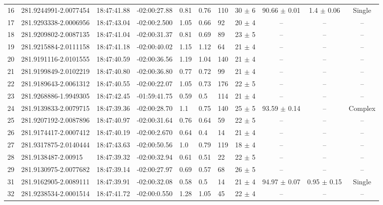 \documentclass[longauth]{aa} %
\begin{document}
\begin{appendix}
\begin{table}[htbp!]
\begin{tabular}{llllllllccc}
16  &  281.9244991-2.0077454  &  18:47:41.88  &  -02:00:27.88  &  0.81  &  0.76  &  110  &  30 $\pm$ 6  &  90.66 $\pm$ 0.01  &  1.4 $\pm$ 0.06  &  Single \\
17  &  281.9293338-2.0006956  &  18:47:43.04  &  -02:00:2.500  &  1.05  &  0.66  &  92  &  20 $\pm$ 4  &  --  &  --  &  -- \\
18  &  281.9209802-2.0087135  &  18:47:41.04  &  -02:00:31.37  &  0.81  &  0.69  &  89  &  23 $\pm$ 5  &  --  &  --  &  -- \\
19  &  281.9215884-2.0111158  &  18:47:41.18  &  -02:00:40.02  &  1.15  &  1.12  &  64  &  21 $\pm$ 4  &  --  &  --  &  -- \\
20  &  281.9191116-2.0101555  &  18:47:40.59  &  -02:00:36.56  &  1.19  &  1.04  &  140  &  21 $\pm$ 4  &  --  &  --  &  -- \\
21  &  281.9199849-2.0102219  &  18:47:40.80  &  -02:00:36.80  &  0.77  &  0.72  &  99  &  21 $\pm$ 4  &  --  &  --  &  -- \\
22  &  281.9189643-2.0061312  &  18:47:40.55  &  -02:00:22.07  &  1.05  &  0.73  &  176  &  22 $\pm$ 5  &  --  &  --  &  -- \\
23  &  281.9268886-1.9949305  &  18:47:42.45  &  -01:59:41.75  &  0.59  &  0.5  &  114  &  21 $\pm$ 4  &  --  &  --  &  -- \\
24  &  281.9139833-2.0079715  &  18:47:39.36  &  -02:00:28.70  &  1.1  &  0.75  &  140  &  25 $\pm$ 5  &  93.59 $\pm$ 0.14  &  --  &  Complex \\
25  &  281.9207192-2.0087896  &  18:47:40.97  &  -02:00:31.64  &  0.76  &  0.64  &  59  &  22 $\pm$ 5  &  --  &  --  &  -- \\
26  &  281.9174417-2.0007412  &  18:47:40.19  &  -02:00:2.670  &  0.64  &  0.4  &  14  &  21 $\pm$ 4  &  --  &  --  &  -- \\
27  &  281.9317875-2.0140444  &  18:47:43.63  &  -02:00:50.56  &  1.0  &  0.79  &  119  &  18 $\pm$ 4  &  --  &  --  &  -- \\
28  &  281.9138487-2.00915  &  18:47:39.32  &  -02:00:32.94  &  0.61  &  0.51  &  22  &  22 $\pm$ 5  &  --  &  --  &  -- \\
29  &  281.9130975-2.0077682  &  18:47:39.14  &  -02:00:27.97  &  0.69  &  0.57  &  68  &  26 $\pm$ 5  &  --  &  --  &  -- \\
31  &  281.9162905-2.0089111  &  18:47:39.91  &  -02:00:32.08  &  0.58  &  0.5  &  14  &  21 $\pm$ 4  &  94.97 $\pm$ 0.07  &  0.95 $\pm$ 0.15  &  Single \\
32  &  281.9238534-2.0001514  &  18:47:41.72  &  -02:00:0.550  &  1.28  &  1.05  &  45  &  22 $\pm$ 4  &  --  &  --  &  -- \\

\end{tabular}
\end{table}
\end{appendix}
\end{document}
